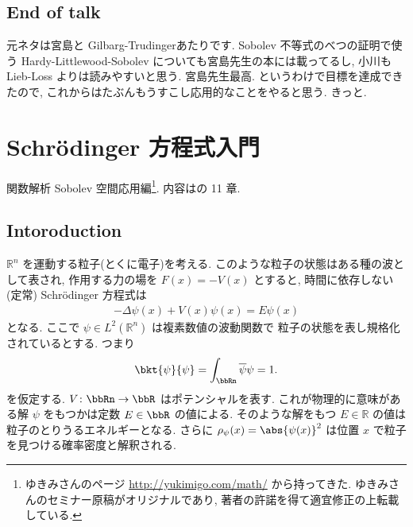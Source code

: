 \documentclass[openany, a4paper, oneside]{jsbook}
\begin{document}
\section{End of talk}

元ネタは宮島\cite{ShizuoMiyajima1}と Gilbarg-Trudinger\cite{GilbargTrudinger1}あたりです.
Sobolev 不等式のべつの証明で使う Hardy-Littlewood-Sobolev についても宮島先生の本には載ってるし,
小川\cite{TakayoshiOgawa1}も Lieb-Loss よりは読みやすいと思う.
宮島先生最高.
というわけで目標を達成できたので, これからはたぶんもうすこし応用的なことをやると思う.
きっと.
\chapter{Schr\"odinger 方程式入門}

関数解析 Sobolev 空間応用編\footnote{ゆきみさんのページ \url{http://yukimigo.com/math/} から持ってきた.
ゆきみさんのセミナー原稿がオリジナルであり, 著者の許諾を得て適宜修正の上転載している.}.
内容は\cite{LiebLoss1}の 11 章.


\section{Intoroduction}

$\mathbb{R}^n$ を運動する粒子(とくに電子)を考える.
このような粒子の状態はある種の波として表され,
作用する力の場を $F(x) = - V(x)$ とすると,
時間に依存しない (定常) Schr\"odinger 方程式は
\begin{align}
 -\Delta \psi (x) + V(x) \psi (x)
 =
 E \psi (x)
\end{align}
となる.
ここで $\psi \in L^2(\mathbb{R}^n)$ は複素数値の波動関数で
粒子の状態を表し規格化されているとする.
つまり
\begin{align}
 \bkt{\psi}{\psi}
 =
 \int_{\bbRn} \overline{\psi} \psi
 = 1.
\end{align}
を仮定する.
$V \colon \bbRn \to \bbR$ はポテンシャルを表す.
これが物理的に意味がある解 $\psi$ をもつかは定数 $E \in \bbR$ の値による.
そのような解をもつ $E \in \mathbb{R}$ の値は粒子のとりうるエネルギーとなる.
さらに $\rho_{\psi} (x)= \abs{\psi (x)}^2$ は位置 $x$ で粒子を見つける確率密度と解釈される.
\end{document}
